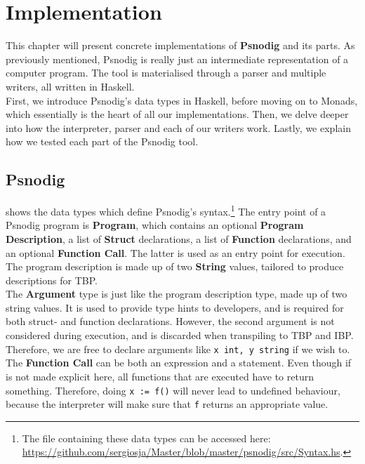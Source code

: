 \chapter{Implementation}

This chapter will present concrete implementations of \textbf{Psnodig} and its parts. As previously mentioned, Psnodig is really just an intermediate representation of a computer program. The tool is materialised through a parser and multiple writers, all written in Haskell. \\

First, we introduce Psnodig's data types in Haskell, before moving on to Monads, which essentially is the heart of all our implementations. Then, we delve deeper into how the interpreter, parser and each of our writers work. Lastly, we explain how we tested each part of the Psnodig tool.

\section{Psnodig}

 shows the data types which define Psnodig's syntax.\footnote{The file containing these data types can be accessed here: \url{https://github.com/sergiosja/Master/blob/master/psnodig/src/Syntax.hs}.} The entry point of a Psnodig program is \textbf{Program}, which contains an optional \textbf{Program Description}, a list of \textbf{Struct} declarations, a list of \textbf{Function} declarations, and an optional \textbf{Function Call}. The latter is used as an entry point for execution. The program description is made up of two \textbf{String} values, tailored to produce descriptions for TBP. \\

The \textbf{Argument} type is just like the program description type, made up of two string values. It is used to provide type hints to developers, and is required for both struct- and function declarations. However, the second argument is not considered during execution, and is discarded when transpiling to TBP and IBP. Therefore, we are free to declare arguments like \texttt{x int, y string} if we wish to. \\

The \textbf{Function Call} can be both an expression and a statement. Even though if is not made explicit here, all functions that are executed have to return something. Therefore, doing \texttt{x := f()} will never lead to undefined behaviour, because the interpreter will make sure that \texttt{f} returns an appropriate value. \\

